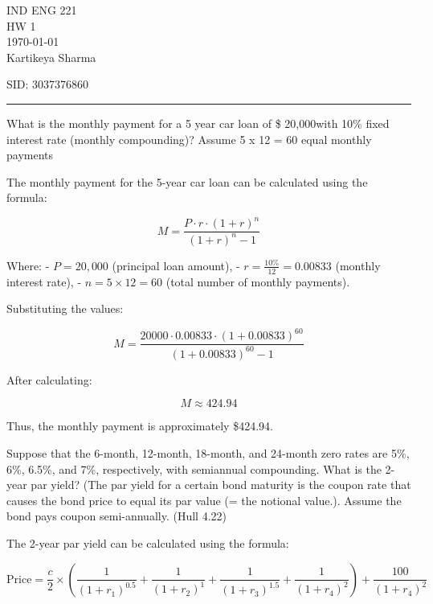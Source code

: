 \documentclass[12pt,letterpaper, onecolumn]{exam}
\begin{document}
\begingroup  
    \centering
    \LARGE IND ENG 221\\
    \LARGE HW 1\\[0.5em]
    \large \today\\[0.5em]
    \large Kartikeya Sharma\par
    \large SID: 3037376860\par
\endgroup
\rule{\textwidth}{0.4pt}
\pointsdroppedatright   %
\printanswers
\renewcommand{\solutiontitle}{\noindent\textbf{Ans:}\enspace}   %

\begin{questions}

    \question What is the monthly payment for a 5 year car loan of \$ 20,000with 10\% fixed interest rate (monthly compounding)? Assume 5 x 12 = 60 equal monthly payments
    
    \begin{solution}
        The monthly payment for the 5-year car loan can be calculated using the formula:

\[
M = \frac{P \cdot r \cdot (1 + r)^n}{(1 + r)^n - 1}
\]

Where:
- \( P = 20,000 \) (principal loan amount),
- \( r = \frac{10\%}{12} = 0.00833 \) (monthly interest rate),
- \( n = 5 \times 12 = 60 \) (total number of monthly payments).

Substituting the values:

\[
M = \frac{20000 \cdot 0.00833 \cdot (1 + 0.00833)^{60}}{(1 + 0.00833)^{60} - 1}
\]

After calculating:

\[
M \approx 424.94
\]

Thus, the monthly payment is approximately \$424.94.

    \end{solution}

    \newpage
    \question Suppose that the 6-month, 12-month, 18-month, and 24-month zero rates are 5\%, 6\%, 6.5\%, and 7\%, respectively, with semiannual compounding. What is the 2-year par yield? (The par yield for a certain bond maturity is the coupon rate that causes the bond price to equal its par value (= the notional value.). Assume the bond pays coupon semi-annually. (Hull 4.22)

    \begin{solution}
            The 2-year par yield can be calculated using the formula:

\[
\text{Price} = \frac{c}{2} \times \left( \frac{1}{(1 + r_1)^{0.5}} + \frac{1}{(1 + r_2)^{1}} + \frac{1}{(1 + r_3)^{1.5}} + \frac{1}{(1 + r_4)^{2}} \right) + \frac{100}{(1 + r_4)^{2}}
\]


\end{solution}
\end{questions}
\end{document}
